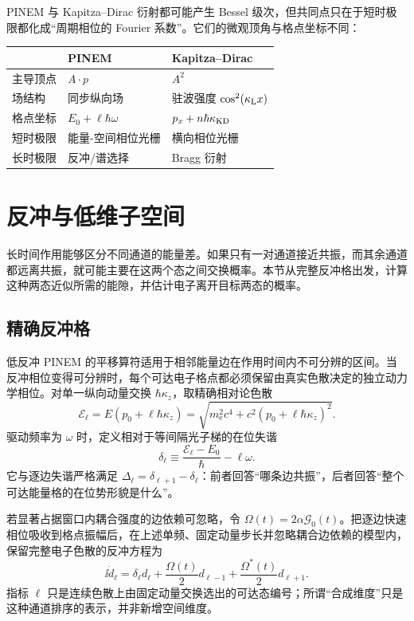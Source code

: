 PINEM 与 Kapitza--Dirac 衍射都可能产生 Bessel 级次，但共同点只在于短时极限都化成“周期相位的 Fourier 系数”。它们的微观顶角与格点坐标不同：
\begin{center}
\begin{tabular}{lll}
\toprule
 & PINEM & Kapitza--Dirac\\
\midrule
主导顶点 & $A\!\cdot\!p$ & $A^2$\\
场结构 & 同步纵向场 & 驻波强度 $\cos^2(\kappa_{\rm L}x)$\\
格点坐标 & $E_0+\ell\hbar\omega$ & $p_x+n\hbar\kappa_{\rm KD}$\\
短时极限 & 能量-空间相位光栅 & 横向相位光栅\\
长时极限 & 反冲/谱选择 & Bragg 衍射\\
\bottomrule
\end{tabular}
\end{center}

\section{反冲与低维子空间}

长时间作用能够区分不同通道的能量差。如果只有一对通道接近共振，而其余通道都远离共振，就可能主要在这两个态之间交换概率。本节从完整反冲格出发，计算这种两态近似所需的能隙，并估计电子离开目标两态的概率。

\subsection{精确反冲格}\label{subsec:exact-recoil-lattice-dp19}

低反冲 PINEM 的平移算符适用于相邻能量边在作用时间内不可分辨的区间。当反冲相位变得可分辨时，每个可达电子格点都必须保留由真实色散决定的独立动力学相位。对单一纵向动量交换 $\hbar \kappa_z$，取精确相对论色散
\begin{equation*}
\mathcal E_\ell
=E(p_0+\ell\hbar \kappa_z)
=\sqrt{m_{\mathrm e}^2c^4+c^2(p_0+\ell\hbar \kappa_z)^2}.
\end{equation*}
驱动频率为 $\omega$ 时，定义相对于等间隔光子梯的在位失谐
\begin{equation}
\boxed{
\delta_\ell
\equiv\frac{\mathcal E_\ell-E_0}{\hbar}-\ell\omega .}
\label{eq:exact_onsite_detuning}
\end{equation}
它与逐边失谐严格满足 $\Delta_\ell=\delta_{\ell+1}-\delta_\ell$：前者回答“哪条边共振”，后者回答“整个可达能量格的在位势形貌是什么”。

若显著占据窗口内耦合强度的边依赖可忽略，令 $\Omega(t)=2\alpha\mathcal G_0(t)$。把逐边快速相位吸收到格点振幅后，在上述单频、固定动量步长并忽略耦合边依赖的模型内，保留完整电子色散的反冲方程为
\begin{equation}
\boxed{
\ii\dot d_\ell
=\delta_\ell d_\ell
+\frac{\Omega(t)}2d_{\ell-1}
+\frac{\Omega^*(t)}2d_{\ell+1}.}
\label{eq:exact_recoil_tight_binding}
\end{equation}
指标 $\ell$ 只是连续色散上由固定动量交换选出的可达态编号；所谓“合成维度”只是这种通道排序的表示，并非新增空间维度。

